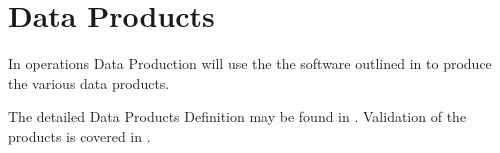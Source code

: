 \section{Data Products} \label{sec:dataproducts}
In operations Data Production will use the the software outlined in  to produce the various data products.

 The detailed  Data Products Definition may be found in  \cite{LSE-163}.
Validation of the products is covered in \cite{PSTN-024}.


